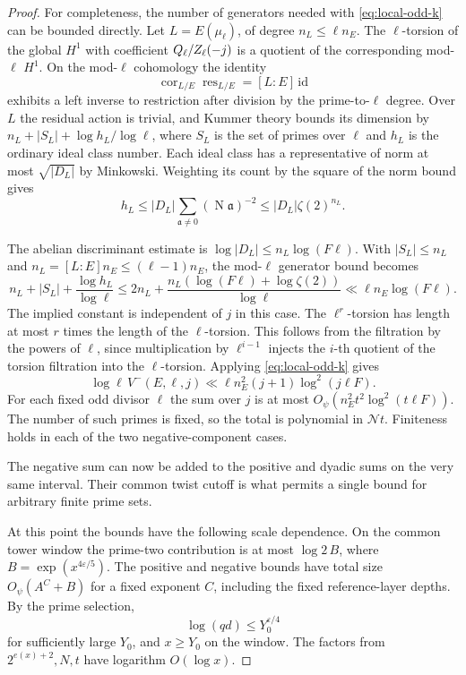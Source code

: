 \begin{proof}

For completeness, the number of generators needed with
\eqref{eq:local-odd-k} can be bounded directly. Let \(L=E(\mu_\ell)\), of
degree \(n_L\le\ell n_E\). The \(\ell\)-torsion of the
global \(H^1\) with coefficient \(Q_\ell/Z_\ell(-j)\)
is a quotient of the corresponding mod-\(\ell\) \(H^1\).
On the mod-\(\ell\) cohomology the identity
\[
 \operatorname{cor}_{L/E}\operatorname{res}_{L/E}=[L:E]\,\mathrm{id}
\]
exhibits a left inverse to restriction after division by the prime-to-\(\ell\) degree. Over \(L\) the residual
action is trivial, and Kummer theory bounds its dimension
by \(n_L+|S_L|+\log h_L/\log\ell\), where \(S_L\) is the
set of primes over \(\ell\) and \(h_L\) is the ordinary
ideal class number. Each ideal class has a representative of norm at most
\(\sqrt{|D_L|}\) by Minkowski. Weighting its count by the
square of the norm bound gives
\[
 h_L\le |D_L|\sum_{\mathfrak a\ne0}
                         (\operatorname N\mathfrak a)^{-2}
       \le |D_L|\zeta(2)^{n_L} .
\]

The abelian discriminant estimate is \(\log |D_L|\le n_L\log(F\ell)\).
With \(|S_L|\le n_L\) and \(n_L=[L:E]n_E\le(\ell-1)n_E\),
the mod-\(\ell\) generator bound becomes
\[
 n_L+|S_L|+\frac{\log h_L}{\log\ell}
     \le 2n_L+
             \frac{n_L(\log(F\ell)+\log\zeta(2))}{\log\ell}
     \ll \ell n_E\log(F\ell).
\]
The implied constant is independent of \(j\) in this case.
The \(\ell^r\)-torsion has length at most \(r\) times
the length of the \(\ell\)-torsion. This follows from
the filtration by the powers of \(\ell\), since multiplication
by \(\ell^{i-1}\) injects the \(i\)-th quotient of the
torsion filtration into the \(\ell\)-torsion.
Applying \eqref{eq:local-odd-k} gives
\[
  \log\ell\, V^-(E,\ell,j)
       \ll \ell n_E^2(j+1)\log^2(j\ell F).
\]
For each fixed odd divisor \(\ell\) the sum over \(j\) is at most
\(O_\psi(n_E^2t^2\log^2(t\ell F))\). The number of such primes is
fixed, so the total is polynomial in \(\mathcal Nt\).
Finiteness holds in each of the two negative-component
cases.
\label{cor:ordinary-odd-primes-13}


The negative sum can now be added to the positive and dyadic sums on the very same interval. Their common twist cutoff is what permits a single bound for arbitrary finite prime sets.


At this point the bounds have the following scale dependence.
On the common tower window the prime-two contribution
is at most \(\log 2\,B\), where \(B=\exp(x^{4\varepsilon/5})\).
The positive and negative bounds have total size
\(O_\psi(A^C+B)\) for a fixed exponent \(C\), including
the fixed reference-layer depths. By the prime selection,
\[
 \log(qd)\le Y_0^{\varepsilon/4}
\]
for sufficiently large
\(Y_0\), and \(x\ge Y_0\) on the window.
The factors from \(2^{e(x)+2},N,t\) have logarithm \(O(\log x)\).


\end{proof}
